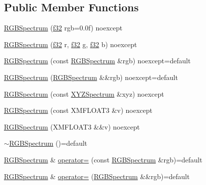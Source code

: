 \subsection*{Public Member Functions}
\begin{DoxyCompactItemize}
\item 
\hyperlink{structmage_1_1_r_g_b_spectrum_a7aace65634e3c3cadcc2f0bbece707ad}{R\+G\+B\+Spectrum} (\hyperlink{namespacemage_a6a44ad388483959dc4dff9f2aef91431}{f32} rgb=0.\+0f) noexcept
\item 
\hyperlink{structmage_1_1_r_g_b_spectrum_a0080ae94b64febe632775eb830fd3e90}{R\+G\+B\+Spectrum} (\hyperlink{namespacemage_a6a44ad388483959dc4dff9f2aef91431}{f32} r, \hyperlink{namespacemage_a6a44ad388483959dc4dff9f2aef91431}{f32} g, \hyperlink{namespacemage_a6a44ad388483959dc4dff9f2aef91431}{f32} b) noexcept
\item 
\hyperlink{structmage_1_1_r_g_b_spectrum_a6afbac378b74b1129a964a73ba0b516b}{R\+G\+B\+Spectrum} (const \hyperlink{structmage_1_1_r_g_b_spectrum}{R\+G\+B\+Spectrum} \&rgb) noexcept=default
\item 
\hyperlink{structmage_1_1_r_g_b_spectrum_a9035556eb53f16ce23ba458cb3e0928f}{R\+G\+B\+Spectrum} (\hyperlink{structmage_1_1_r_g_b_spectrum}{R\+G\+B\+Spectrum} \&\&rgb) noexcept=default
\item 
\hyperlink{structmage_1_1_r_g_b_spectrum_a56dd0c233d2523b1198cd2419f73a9dd}{R\+G\+B\+Spectrum} (const \hyperlink{structmage_1_1_x_y_z_spectrum}{X\+Y\+Z\+Spectrum} \&xyz) noexcept
\item 
\hyperlink{structmage_1_1_r_g_b_spectrum_a9475eed54838d0f8c7aba49bd8df0e6c}{R\+G\+B\+Spectrum} (const X\+M\+F\+L\+O\+A\+T3 \&v) noexcept
\item 
\hyperlink{structmage_1_1_r_g_b_spectrum_a8a30b69cbeefd7f59e51886ce17d48cc}{R\+G\+B\+Spectrum} (X\+M\+F\+L\+O\+A\+T3 \&\&v) noexcept
\item 
\hyperlink{structmage_1_1_r_g_b_spectrum_a7c18a007349953b1e4711a4856680b02}{$\sim$\+R\+G\+B\+Spectrum} ()=default
\item 
\hyperlink{structmage_1_1_r_g_b_spectrum}{R\+G\+B\+Spectrum} \& \hyperlink{structmage_1_1_r_g_b_spectrum_ac4701cc62489d27130853c3ba667a767}{operator=} (const \hyperlink{structmage_1_1_r_g_b_spectrum}{R\+G\+B\+Spectrum} \&rgb)=default
\item 
\hyperlink{structmage_1_1_r_g_b_spectrum}{R\+G\+B\+Spectrum} \& \hyperlink{structmage_1_1_r_g_b_spectrum_a3a487cd0fcb35395c0979552dc551829}{operator=} (\hyperlink{structmage_1_1_r_g_b_spectrum}{R\+G\+B\+Spectrum} \&\&rgb)=default
\end{DoxyCompactItemize}



